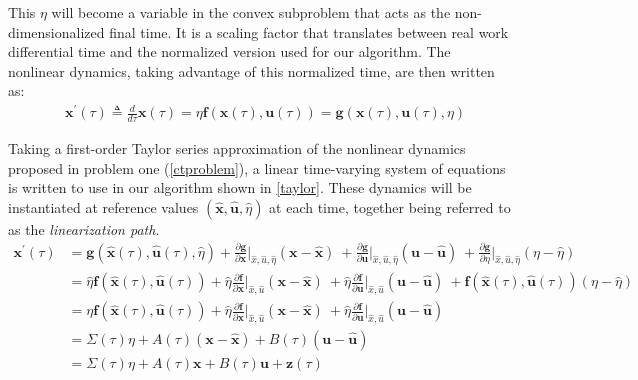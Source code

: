 \documentclass[conf]{new-aiaa}
\begin{document}
This $\eta$ will become a variable in the convex subproblem that acts as the non-dimensionalized final time. It is a scaling factor that translates between real work differential time and the normalized version used for our algorithm. The nonlinear dynamics, taking advantage of this normalized time, are then written as:
\begin{align}
& \mathbf{x}^\prime(\tau) \triangleq \frac{d}{d\tau}\mathbf{x}(\tau) = \eta \mathbf{f}(\mathbf{x}(\tau), \mathbf{u}(\tau)) = \mathbf{g}(\mathbf{x}(\tau), \mathbf{u}(\tau), \eta)
\end{align}

Taking a first-order Taylor series approximation of the nonlinear dynamics proposed in problem one (\ref{ctproblem}), a linear time-varying system of equations is written to use in our algorithm shown in \ref{taylor}. These dynamics will be instantiated at reference values $(\hat{\mathbf{x}}, \hat{\mathbf{u}}, \hat{\eta})$ at each time, together being referred to as the \textit{linearization path}. 
%
\begin{subequations}
\label{taylor}
\begin{align}
\mathbf{x}^\prime(\tau) 
&= \mathbf{g}(\hat{\mathbf{x}}(\tau), \hat{\mathbf{u}}(\tau), \hat{\eta})
+ \frac{\partial \mathbf{g}}{\partial \mathbf{x}} \bigg\rvert_{\hat{x},\hat{u},\hat{\eta}} (\mathbf{x} - \hat{\mathbf{x}}) \ 
+ \frac{\partial \mathbf{g}}{\partial \mathbf{u}} \bigg\rvert_{\hat{x},\hat{u},\hat{\eta}} (\mathbf{u} - \hat{\mathbf{u}}) \ 
+ \frac{\partial \mathbf{g}}{\partial \eta} \bigg\rvert_{\hat{x},\hat{u},\hat{\eta}} (\eta - \hat{\eta}) \\
&= \hat{\eta} \mathbf{f}(\hat{\mathbf{x}}(\tau), \hat{\mathbf{u}}(\tau))
+ \hat{\eta} \frac{\partial \mathbf{f}}{\partial \mathbf{x}} \bigg\rvert_{\hat{x},\hat{u}} (\mathbf{x} - \hat{\mathbf{x}}) \
+ \hat{\eta} \frac{\partial \mathbf{f}}{\partial \mathbf{u}} \bigg\rvert_{\hat{x},\hat{u}} (\mathbf{u} - \hat{\mathbf{u}}) \
+ \mathbf{f}(\hat{\mathbf{x}}(\tau), \hat{\mathbf{u}}(\tau)) (\eta - \hat{\eta}) \\
&= {\eta} \mathbf{f}(\hat{\mathbf{x}}(\tau), \hat{\mathbf{u}}(\tau))
+ \hat{\eta} \frac{\partial \mathbf{f}}{\partial \mathbf{x}} \bigg\rvert_{\hat{x},\hat{u}} (\mathbf{x} - \hat{\mathbf{x}}) \
+ \hat{\eta} \frac{\partial \mathbf{f}}{\partial \mathbf{u}} \bigg\rvert_{\hat{x},\hat{u}} (\mathbf{u} - \hat{\mathbf{u}}) \\ 
& = \Sigma(\tau)\eta + A(\tau) (\mathbf{x} - \hat{\mathbf{x}}) + B(\tau)(\mathbf{u} - \hat{\mathbf{u}})  \\ 
&= \Sigma(\tau)\eta + A(\tau)\mathbf{x} + B(\tau)\mathbf{u} + \mathbf{z}(\tau)
\end{align}
\end{subequations}
\end{document}
